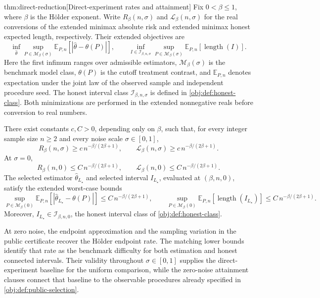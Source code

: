 \documentclass[11pt]{article}
\begin{document}
\begin{theoremv}{thm:direct-reduction}[Direct-experiment rates and attainment]
Fix \(0<\beta\le1\), where \(\beta\) is the Hölder exponent. Write \(R_\beta(n,\sigma)\) and \(\mathcal L_\beta(n,\sigma)\) for the real conversions of the extended minimax absolute risk and extended minimax honest expected length, respectively. Their extended objectives are
\[
\inf_{\widehat\theta}\sup_{P\in\mathcal M_\beta(\sigma)}
\mathbb E_{P,n}\!\left[|\widehat\theta-\theta(P)|\right],
\qquad
\inf_{I\in\mathcal I_{\beta,n,\sigma}}
\sup_{P\in\mathcal M_\beta(\sigma)}
\mathbb E_{P,n}\!\left[\operatorname{length}(I)\right].
\]
Here the first infimum ranges over admissible estimators, \(\mathcal M_\beta(\sigma)\) is the benchmark model class, \(\theta(P)\) is the cutoff treatment contrast, and \(\mathbb E_{P,n}\) denotes expectation under the joint law of the observed sample and independent procedure seed. The honest interval class \(\mathcal I_{\beta,n,\sigma}\) is defined in \cref{obj:def:honest-class}. Both minimizations are performed in the extended nonnegative reals before conversion to real numbers.

There exist constants \(c,C>0\), depending only on \(\beta\), such that, for every integer sample size \(n\ge2\) and every noise scale \(\sigma\in[0,1]\),
\[
R_\beta(n,\sigma)\ge c\,n^{-\beta/(2\beta+1)},
\qquad
\mathcal L_\beta(n,\sigma)\ge c\,n^{-\beta/(2\beta+1)}.
\]
At \(\sigma=0\),
\[
R_\beta(n,0)\le C\,n^{-\beta/(2\beta+1)},
\qquad
\mathcal L_\beta(n,0)\le C\,n^{-\beta/(2\beta+1)}.
\]
The selected estimator \(\widehat\theta_{L_\star}\) and selected interval \(I_{L_\star}\), evaluated at \((\beta,n,0)\), satisfy the extended worst-case bounds
\[
\sup_{P\in\mathcal M_\beta(0)}
\mathbb E_{P,n}\!\left[
|\widehat\theta_{L_\star}-\theta(P)|
\right]
\le C\,n^{-\beta/(2\beta+1)},
\qquad
\sup_{P\in\mathcal M_\beta(0)}
\mathbb E_{P,n}\!\left[
\operatorname{length}(I_{L_\star})
\right]
\le C\,n^{-\beta/(2\beta+1)}.
\]
Moreover, \(I_{L_\star}\in\mathcal I_{\beta,n,0}\), the honest interval class of \cref{obj:def:honest-class}.
\end{theoremv}

At zero noise, the endpoint approximation and the sampling variation in the public certificate recover the Hölder endpoint rate. The matching lower bounds identify that rate as the benchmark difficulty for both estimation and honest connected intervals. Their validity throughout \(\sigma\in[0,1]\) supplies the direct-experiment baseline for the uniform comparison, while the zero-noise attainment clauses connect that baseline to the observable procedures already specified in \cref{obj:def:public-selection}.
\end{document}
